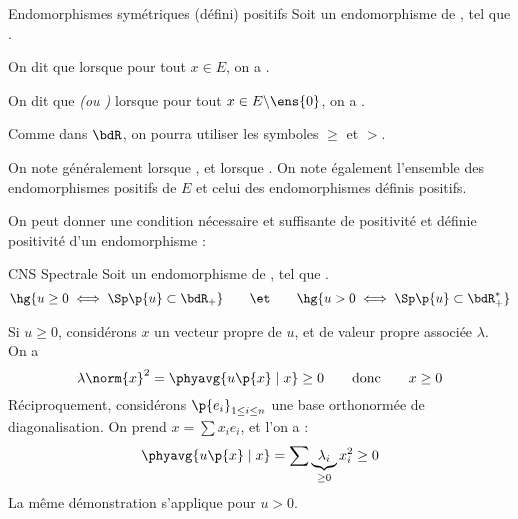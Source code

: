 \documentclass[a4paper,french,bookmarks]{book}
\begin{document}
    \begin{definition}{Endomorphismes symétriques (défini) positifs}{}
        Soit  un endomorphisme de , tel que .
        \begin{enumerate}
            \itast On dit que  lorsque pour tout $x \in E$, on a .
            
            \itast On dit que  \emph{(ou )} lorsque pour tout $x \in E \backslash \ens{0}$, on a .
        \end{enumerate}
    \end{definition}
    
    Comme dans $\bdR$, on pourra utiliser les symboles $\geq$ et $>$. 
    
    \begin{notation}{}{}
        On note généralement  lorsque , et  lorsque . On note également  l'ensemble des endomorphismes positifs de $E$ et  celui des endomorphismes définis positifs.
    \end{notation}
    
    On peut donner une condition nécessaire et suffisante de positivité et définie positivité d'un endomorphisme :
    
    \begin{theorem}{CNS Spectrale}{}
        Soit  un endomorphisme de , tel que .
        \[ \hg{u \geq 0 \iff \Sp\p{u} \subset \bdR_+} \qquad\et\qquad \hg{u > 0 \iff \Sp\p{u} \subset \bdR_+^*}\]
    \end{theorem}
    
    \begin{nproof}
        Si $u \geq 0$, considérons $x$ un vecteur propre de $u$, et de valeur propre associée $\lambda$. On a 
        \[ \lambda \norm{x}^2 = \phyavg{u\p{x} \mid x} \geq 0 \qquad\text{donc}\qquad x \geq 0 \]
        Réciproquement, considérons $\p{e_i}_{1 \leq i \leq n}$ une base orthonormée de diagonalisation. On prend $x = \sum x_ie_i$, et l'on a :
        \[ \phyavg{u\p{x} \mid x } = \sum \underbrace{\lambda_i}_{\geq 0} x_i^2 \geq 0 \]
        La même démonstration s'applique pour $u > 0$.
    \end{nproof}
    
\end{document}
